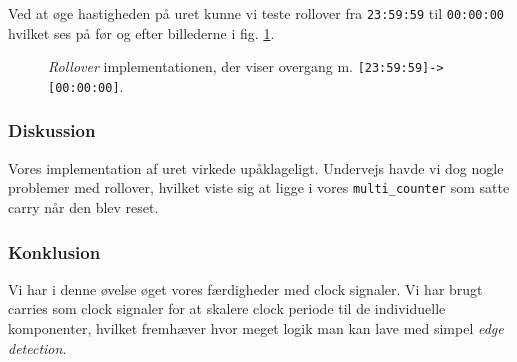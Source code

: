 {    Ved at øge hastigheden på uret kunne vi teste rollover fra \texttt{23:59:59} til \texttt{00:00:00} hvilket ses på før og efter billederne i fig. \ref{fig:ex6-3-rollover}.

    \begin{figure}[H]
        \centering
        \caption{\emph{Rollover} implementationen, der viser overgang m. \texttt{[23:59:59]->[00:00:00]}.}\label{fig:ex6-3-rollover}
    \end{figure}

    \subsubsection{Diskussion}

    Vores implementation af uret virkede upåklageligt. Undervejs havde vi dog nogle problemer med rollover, hvilket viste sig at ligge i vores \texttt{multi\_counter} som satte carry når den blev reset.

    \subsubsection{Konklusion}

    Vi har i denne øvelse øget vores færdigheder med clock signaler. Vi har brugt carries som clock signaler for at skalere clock periode til de individuelle komponenter, hvilket fremhæver hvor meget logik man kan lave med simpel \emph{edge detection}.
}